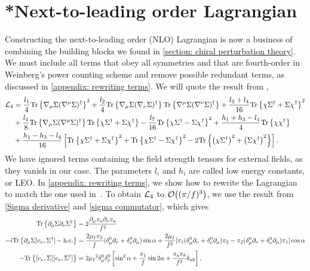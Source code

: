 \section{*Next-to-leading order Lagrangian}

Constructing the next-to-leading order (NLO) Lagrangian is now a business of combining the building blocks we found in \autoref{section: chiral perturbation theory}. 
We must include all terms that obey all symmetries and that are fourth-order in Weinberg's power counting scheme and remove possible redundant terms, as discussed in \autoref{appendix: rewriting terms}.
We will quote the result from \cite{schererIntroductionChiralPerturbation2002},
%
\begin{align}
    \notag
    \mathcal{L}_4 
    & = 
    \frac{l_1}{4}\text{Tr} \left\{ \nabla_\mu \Sigma (\nabla^\mu \Sigma)^\dagger \right\}^2
    + \frac{l_2}{4} \text{Tr} \left\{ \nabla_\mu \Sigma (\nabla_\nu \Sigma)^\dagger \right\} 
    \text{Tr} \left\{ \nabla^\mu \Sigma (\nabla^\nu \Sigma)^\dagger \right\} 
    +
    \frac{l_3 + l_4}{16} \text{Tr} \left\{ \chi \Sigma^\dagger + \Sigma \chi^\dagger \right\}^2
    \\ \notag
    &
    + \frac{l_4}{8}\text{Tr} \left\{ \nabla_\mu \Sigma (\nabla^\mu \Sigma)^\dagger \right\} \text{Tr} \left\{ \chi \Sigma^\dagger + \Sigma \chi^\dagger \right\}
    - \frac{l_7}{16} \text{Tr} \left\{ \chi \Sigma^\dagger - \Sigma \chi^\dagger \right\}^2
    + \frac{h_1 + h_3 - l_4}{4} \text{Tr} \left\{ \chi \chi^\dagger \right\} \\
    & +
    \frac{h_1 - h_3 - l_4}{16}
    \left[
        \text{Tr} \left\{ \chi \Sigma^\dagger + \Sigma \chi^\dagger \right\}^2
        + \text{Tr} \left\{ \chi \Sigma^\dagger - \Sigma \chi^\dagger \right\}^2
        -2 \text{Tr} \left\{ \left(\chi \Sigma^\dagger\right)^2 + \left( \Sigma \chi^\dagger\right)^2 \right\}
    \right]
    \label{NLO Lagrangian}.
\end{align}
%
We have ignored terms containing the field strength tensors for external fields, as they vanish in our case.
The parameters $l_i$ and $h_i$ are called low energy constants, or LEO.
In \autoref{appendix: rewriting terms}, we show how to rewrite the Lagrangian to match the one used in~\autocite{adhikariTwoflavorChiralPerturbation2019,martinariaTwoflavorChiralPerturbation2020}.
To obtain $\mathcal{L}_4$ to $\mathcal O{\left((\pi/f)^3\right)}$, we use the result from \autoref{Sigma derivative} and \autoref{sigma commutator}, which gives
%
\begin{align*}
    \text{Tr} \left\{ \partial_\mu \Sigma \partial_\nu \Sigma^\dagger \right\}
    & = 2 \frac{\partial_\mu \pi_a \partial_\nu \pi_a}{f^2} \\
    -i \text{Tr} \left\{ \partial_\mu \Sigma [v_\nu, \Sigma^\dagger] - \text{h.c.} \right\}
    & = 
    \frac{2\mu_I\pi_2}{f}(\delta_\mu^0\partial_\nu + \delta_\nu^0\partial_\mu)\sin{\alpha} + 
    \frac{2\mu_I}{f^2}
    [
        \pi_1 (\delta_\mu^0\partial_\nu + \delta_\nu^0\partial_\mu)\pi_2 
        - \pi_2 (\delta_\mu^0\partial_\nu + \delta_\nu^0\partial_\mu)\pi_1
    ]\cos{\alpha}
    \\
    - \text{Tr} \left\{ [v_\nu, \Sigma] [v_\nu, \Sigma^\dagger] \right\}
    & = 2 \mu_I{}^2 \delta_\mu^0 \delta_\nu^0 
    \left[
        \sin^2{\alpha} + \frac{\pi_1}{f} \sin{2\alpha} 
        + \frac{\pi_a \pi_b}{f^2} 
        k_{ab}
    \right],
\end{align*}

